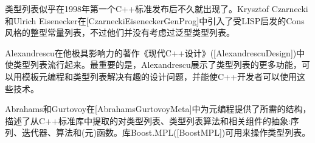 类型列表似乎在1998年第一个C++标准发布后不久就出现了。Krysztof Czarnecki和Ulrich Eisenecker在[CzarneckiEiseneckerGenProg]中引入了受LISP启发的Cons风格的整型常量列表，不过他们并没有考虑过泛型类型列表。

Alexandrescu在他极具影响力的著作《现代C++设计》([AlexandrescuDesign])中使类型列表流行起来。最重要的是，Alexandrescu展示了类型列表的更多功能，可以用模板元编程和类型列表解决有趣的设计问题，并能使C++开发者可以使用这些技术。

Abrahams和Gurtovoy在[AbrahamsGurtovoyMeta]中为元编程提供了所需的结构，描述了从C++标准库中提取的对类型列表、类型列表算法和相关组件的抽象:序列、迭代器、算法和(元)函数。库Boost.MPL([BoostMPL])可用来操作类型列表。